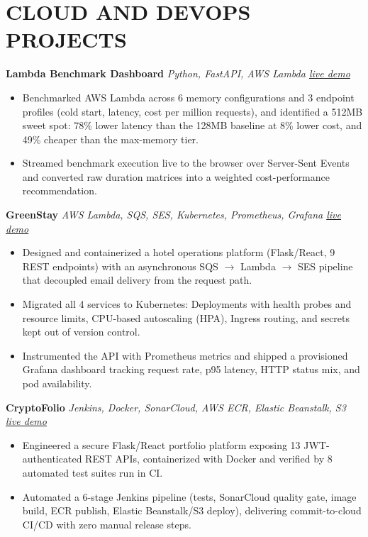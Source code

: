 \documentclass[10pt,a4paper]{article}
\newcommand{\project}[2]{%
  \textbf{#1} \textcolor{rulegray}{\textbar{}} \textit{#2}%
}
\begin{document}
\section{CLOUD AND DEVOPS PROJECTS}
\project{Lambda Benchmark Dashboard}{Python, FastAPI, AWS Lambda \textcolor{rulegray}{\textbar{}} \href{https://aftabmulani11.github.io/lambda-benchmark-dashboard/}{\textcolor{brandblue}{live demo}}}
\begin{itemize}
  \item Benchmarked AWS Lambda across 6 memory configurations and 3 endpoint profiles (cold start, latency, cost per million requests), and identified a 512MB sweet spot: 78\% lower latency than the 128MB baseline at 8\% lower cost, and 49\% cheaper than the max-memory tier.
  \item Streamed benchmark execution live to the browser over Server-Sent Events and converted raw duration matrices into a weighted cost-performance recommendation.
\end{itemize}

\project{GreenStay}{AWS Lambda, SQS, SES, Kubernetes, Prometheus, Grafana \textcolor{rulegray}{\textbar{}} \href{https://aftabmulani11.github.io/greenstay/}{\textcolor{brandblue}{live demo}}}
\begin{itemize}
  \item Designed and containerized a hotel operations platform (Flask/React, 9 REST endpoints) with an asynchronous SQS \(\to\) Lambda \(\to\) SES pipeline that decoupled email delivery from the request path.
  \item Migrated all 4 services to Kubernetes: Deployments with health probes and resource limits, CPU-based autoscaling (HPA), Ingress routing, and secrets kept out of version control.
  \item Instrumented the API with Prometheus metrics and shipped a provisioned Grafana dashboard tracking request rate, p95 latency, HTTP status mix, and pod availability.
\end{itemize}

\project{CryptoFolio}{Jenkins, Docker, SonarCloud, AWS ECR, Elastic Beanstalk, S3 \textcolor{rulegray}{\textbar{}} \href{https://aftabmulani11.github.io/cryptofolio/}{\textcolor{brandblue}{live demo}}}
\begin{itemize}
  \item Engineered a secure Flask/React portfolio platform exposing 13 JWT-authenticated REST APIs, containerized with Docker and verified by 8 automated test suites run in CI.
  \item Automated a 6-stage Jenkins pipeline (tests, SonarCloud quality gate, image build, ECR publish, Elastic Beanstalk/S3 deploy), delivering commit-to-cloud CI/CD with zero manual release steps.
\end{itemize}
\end{document}
